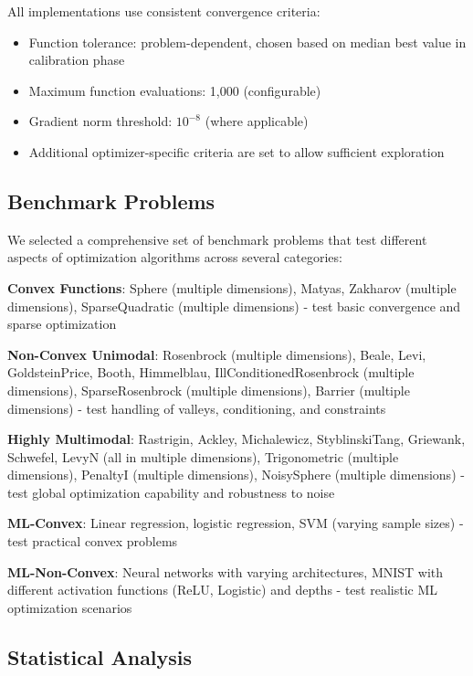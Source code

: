 All implementations use consistent convergence criteria:

\begin{itemize}
\tightlist
\item
  Function tolerance: problem-dependent, chosen based on median best value in calibration phase
\item
  Maximum function evaluations: 1,000 (configurable)
\item
  Gradient norm threshold: \(10^{-8}\) (where applicable)
\item
  Additional optimizer-specific criteria are set to allow sufficient exploration
\end{itemize}

\hypertarget{benchmark-problems}{%
\subsection{Benchmark Problems}\label{benchmark-problems}}

We selected a comprehensive set of benchmark problems that test different aspects of optimization algorithms across several categories:

\textbf{Convex Functions}: Sphere (multiple dimensions), Matyas, Zakharov (multiple dimensions), SparseQuadratic (multiple dimensions) - test basic convergence and sparse optimization

\textbf{Non-Convex Unimodal}: Rosenbrock (multiple dimensions), Beale, Levi, GoldsteinPrice, Booth, Himmelblau, IllConditionedRosenbrock (multiple dimensions), SparseRosenbrock (multiple dimensions), Barrier (multiple dimensions) - test handling of valleys, conditioning, and constraints

\textbf{Highly Multimodal}: Rastrigin, Ackley, Michalewicz, StyblinskiTang, Griewank, Schwefel, LevyN (all in multiple dimensions), Trigonometric (multiple dimensions), PenaltyI (multiple dimensions), NoisySphere (multiple dimensions) - test global optimization capability and robustness to noise

\textbf{ML-Convex}: Linear regression, logistic regression, SVM (varying sample sizes) - test practical convex problems

\textbf{ML-Non-Convex}: Neural networks with varying architectures, MNIST with different activation functions (ReLU, Logistic) and depths - test realistic ML optimization scenarios

\hypertarget{statistical-analysis}{%
\subsection{Statistical Analysis}\label{statistical-analysis}}

